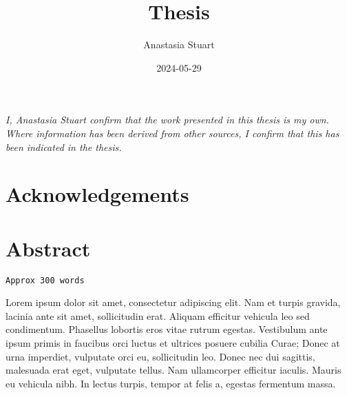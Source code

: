\documentclass[
]{article}
\title{Thesis}
\author{Anastasia Stuart}
\date{2024-05-29}
\begin{document}
\maketitle

\vspace*{\fill}

\noindent \textit{
I, Anastasia Stuart confirm that the work presented in this thesis is my own. Where information has been derived from other sources, I confirm that this has been indicated in the thesis.
} \vspace*{\fill}  \newpage

\section*{Acknowledgements}\label{acknowledgements}

\newpage

\section*{Abstract}\label{abstract}

\begin{verbatim}
Approx 300 words
\end{verbatim}

Lorem ipsum dolor sit amet, consectetur adipiscing elit. Nam et turpis
gravida, lacinia ante sit amet, sollicitudin erat. Aliquam efficitur
vehicula leo sed condimentum. Phasellus lobortis eros vitae rutrum
egestas. Vestibulum ante ipsum primis in faucibus orci luctus et
ultrices posuere cubilia Curae; Donec at urna imperdiet, vulputate orci
eu, sollicitudin leo. Donec nec dui sagittis, malesuada erat eget,
vulputate tellus. Nam ullamcorper efficitur iaculis. Mauris eu vehicula
nibh. In lectus turpis, tempor at felis a, egestas fermentum massa.

\newpage 
{}
\setcounter{page}{1}


\tableofcontents

\newpage


\tableofcontents

\newpage

\listoffigures

\newpage

\listoftables
\end{document}
